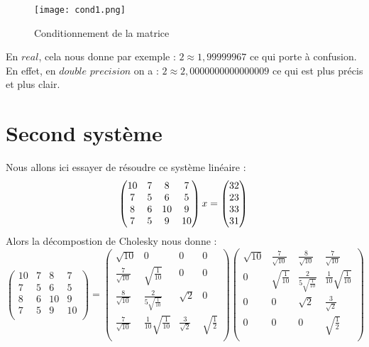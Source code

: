\documentclass[a4paper, titlepage]{livret}													%
\begin{document}
		\begin{figure}[!ht]
			\centering
  				\texttt{[image: cond1.png]}
  				\caption{Conditionnement de la matrice}
		\end{figure}
		En $real$, cela nous donne par exemple : $2 \approx 1,99999967$ ce qui porte à confusion.
		En effet, en $double$ $precision$ on a : $2 \approx 2,0000000000000009$ ce qui est plus précis et plus clair.

	\section{Second système}
		Nous allons ici essayer de résoudre ce système linéaire :
			\[
				\begin{pmatrix}
					10 & 7 & 8 & 7 \\
					7 & 5 & 6 & 5 \\
					8 & 6 & 10 & 9 \\
					7 & 5 & 9 & 10 \\
				\end{pmatrix}
				x =
				\begin{pmatrix}
					32 \\
					23 \\
					33 \\
					31 \\
				\end{pmatrix} \\
			\]
		Alors la décompostion de Cholesky nous donne :
			\[
				    \begin{pmatrix}
                        10 & 7 & 8 & 7\\
                        7 & 5 & 6 & 5\\
                        8 & 6 & 10 & 9\\
                        7 & 5 & 9 & 10\\
                    \end{pmatrix} =
                    \begin{pmatrix}
                        \sqrt{10} & 0 & 0 & 0\\
                         \frac{7}{\sqrt{{10}}} & \sqrt{\frac{1}{10}} & 0 & 0\\
                        \frac{8}{\sqrt{10}} & \frac{2}{5\sqrt{\frac{1}{10}}} & \sqrt{2} & 0\\
                        \frac{7}{\sqrt{10}} & \frac{1}{10}{\sqrt{\frac{1}{10}}} & \frac{3}{\sqrt{2}} & \sqrt{\frac{1}{2}}\\
                    \end{pmatrix}
                    \begin{pmatrix}
                        \sqrt{10} & \frac{7}{\sqrt{10}} & \frac{8}{\sqrt{10}} & \frac{7}{\sqrt{10}}\\
                        0 & \sqrt{\frac{1}{10}} & \frac{2}{5\sqrt{\frac{1}{10}}} & \frac{1}{10}{\sqrt{\frac{1}{10}}}\\
                        0 & 0 & \sqrt{2} & \frac{3}{\sqrt{2}}\\
                        0 & 0 & 0 & \sqrt{\frac{1}{2}}\\
                    \end{pmatrix}
			\]
\end{document}
